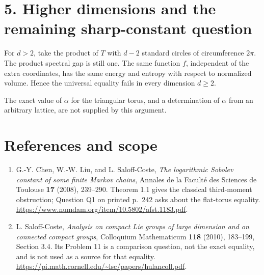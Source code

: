 \documentclass[11pt,a4paper]{article}
\providecommand{\tightlist}{\setlength{\itemsep}{0pt}\setlength{\parskip}{0pt}}
\begin{document}
\hypertarget{1019-higher-dimensions-and-the-remaining-sharp-constant-question}{%
\section{5. Higher dimensions and the remaining sharp-constant
question}\label{1019-higher-dimensions-and-the-remaining-sharp-constant-question}}

For \(d>2\), take the product of \(T\) with \(d-2\) standard circles of
circumference \(2\pi\). The product spectral gap is still one. The same
function \(f\), independent of the extra coordinates, has the same
energy and entropy with respect to normalized volume. Hence the
universal equality fails in every dimension \(d\geq2\).

The exact value of \(\alpha\) for the triangular torus, and a
determination of \(\alpha\) from an arbitrary lattice, are not supplied
by this argument.

\hypertarget{1019-references-and-scope}{%
\section{References and scope}\label{1019-references-and-scope}}

\begin{enumerate}
\def\labelenumi{\arabic{enumi}.}
\tightlist
\item
  G.-Y. Chen, W.-W. Liu, and L. Saloff-Coste, \emph{The logarithmic
  Sobolev constant of some finite Markov chains}, Annales de la Faculté
  des Sciences de Toulouse \textbf{17} (2008), 239--290. Theorem 1.1
  gives the classical third-moment obstruction; Question Q1 on printed
  p.~242 asks about the flat-torus equality.
  \url{https://www.numdam.org/item/10.5802/afst.1183.pdf}.
\item
  L. Saloff-Coste, \emph{Analysis on compact Lie groups of large
  dimension and on connected compact groups}, Colloquium Mathematicum
  \textbf{118} (2010), 183--199, Section 3.4. Its Problem 11 is a
  comparison question, not the exact equality, and is not used as a
  source for that equality.
  \url{https://pi.math.cornell.edu/~lsc/papers/hulancoll.pdf}.
\end{enumerate}
\end{document}
